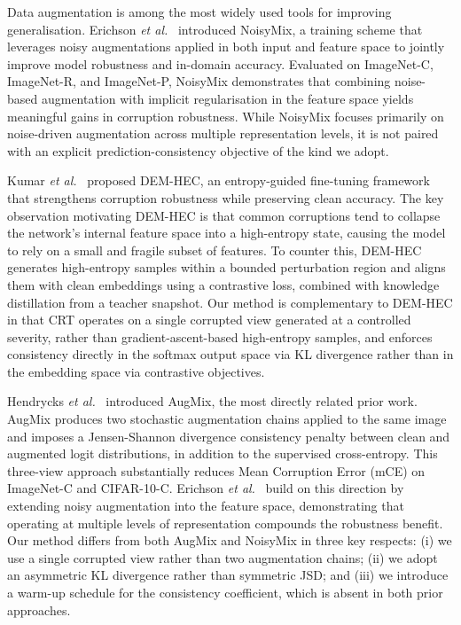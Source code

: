 \documentclass[10pt,twocolumn]{article}
\begin{document}
Data augmentation is among the most widely used tools for improving generalisation. Erichson \emph{et al.}~\cite{erichson2024noisymix} introduced NoisyMix, a training scheme that leverages noisy augmentations applied in both input and feature space to jointly improve model robustness and in-domain accuracy. Evaluated on ImageNet-C, ImageNet-R, and ImageNet-P, NoisyMix demonstrates that combining noise-based augmentation with implicit regularisation in the feature space yields meaningful gains in corruption robustness. While NoisyMix focuses primarily on noise-driven augmentation across multiple representation levels, it is not paired with an explicit prediction-consistency objective of the kind we adopt.

Kumar \emph{et al.}~\cite{kumar2026demhec} proposed DEM-HEC, an entropy-guided fine-tuning framework that strengthens corruption robustness while preserving clean accuracy. The key observation motivating DEM-HEC is that common corruptions tend to collapse the network's internal feature space into a high-entropy state, causing the model to rely on a small and fragile subset of features. To counter this, DEM-HEC generates high-entropy samples within a bounded perturbation region and aligns them with clean embeddings using a contrastive loss, combined with knowledge distillation from a teacher snapshot. Our method is complementary to DEM-HEC in that CRT operates on a single corrupted view generated at a controlled severity, rather than gradient-ascent-based high-entropy samples, and enforces consistency directly in the softmax output space via KL divergence rather than in the embedding space via contrastive objectives.

Hendrycks \emph{et al.}~\cite{hendrycks2020augmix} introduced AugMix, the most directly related prior work. AugMix produces two stochastic augmentation chains applied to the same image and imposes a Jensen-Shannon divergence consistency penalty between clean and augmented logit distributions, in addition to the supervised cross-entropy. This three-view approach substantially reduces Mean Corruption Error (mCE) on ImageNet-C and CIFAR-10-C. Erichson \emph{et al.}~\cite{erichson2024noisymix} build on this direction by extending noisy augmentation into the feature space, demonstrating that operating at multiple levels of representation compounds the robustness benefit. Our method differs from both AugMix and NoisyMix in three key respects: (i) we use a single corrupted view rather than two augmentation chains; (ii) we adopt an asymmetric KL divergence rather than symmetric JSD; and (iii) we introduce a warm-up schedule for the consistency coefficient, which is absent in both prior approaches.
\end{document}
